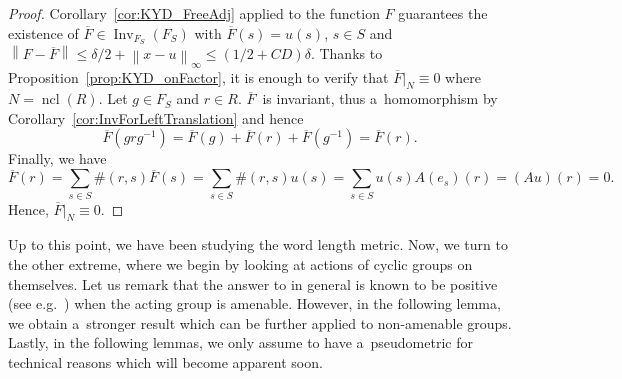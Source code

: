 \documentclass[11pt,a4paper]{amsart}
\theoremstyle{definition}
\newcommand{\FBar}{\overline{F}}
\newcommand{\ncl}{\operatorname{ncl}}
\newcommand{\norm}[1]{\left\| #1 \right\|}
\newcommand{\inv}{\operatorname{Inv}}
\begin{document}
\begin{proof}
		Corollary~\ref{cor:KYD_FreeAdj} applied to the function $F$ guarantees the existence of $\FBar \in \inv_{F_S}(F_S)$ with $\FBar(s) = u(s)$, $s \in S$ and $\norm{F - \FBar} \leq \delta/2 + \norm{x-u}_\infty \leq (1/2+CD)\delta$. Thanks to Proposition~\ref{prop:KYD_onFactor}, it is enough to verify that $\FBar|_{N} \equiv 0$ where $N = \ncl(R)$. Let $g \in F_S$ and $r \in R$. $\FBar$~is invariant, thus a~homomorphism by Corollary~\ref{cor:InvForLeftTranslation} and hence
		\begin{equation*}
			\FBar(g r g^{-1}) = \FBar(g) + \FBar(r) + \FBar(g^{-1}) = \FBar(r).
		\end{equation*}
		Finally, we have
		\begin{equation*}
			\FBar(r)
			= \sum_{s\in S} \#(r, s)\FBar(s)
			= \sum_{s\in S} \#(r, s) u(s)
			= \sum_{s\in S} u(s) A(e_s)(r)
			= (Au)(r)
			= 0.
		\end{equation*}
		Hence, $\FBar|_{N} \equiv 0$.
	\end{proof}
	
	Up to this point, we have been studying the word length metric. Now, we turn to the other extreme, where we begin by looking at actions of cyclic groups on themselves. Let us remark that the answer to  in general is known to be positive (see e.g.~\cite{Glasner22}) when the acting group is amenable. However, in the following lemma, we obtain a~stronger result which can be further applied to non-amenable groups. Lastly, in the following lemmas, we only assume to have a~pseudometric for technical reasons which will become apparent soon.
	
\end{document}
